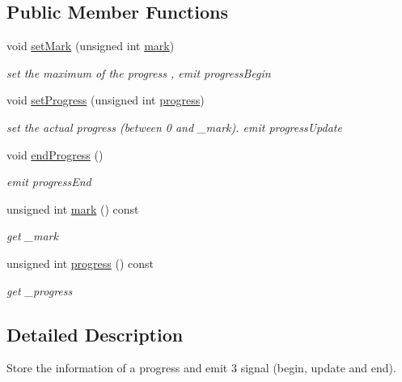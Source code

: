 \subsection*{Public Member Functions}
\begin{DoxyCompactItemize}
\item 
void \mbox{\hyperlink{class_progress_info_ac67672902957c1cd4629d33ed1d76e81}{set\+Mark}} (unsigned int \mbox{\hyperlink{class_progress_info_a9d81184d13006d316c5c46133b7ff409}{mark}})
\begin{DoxyCompactList}\small\item\em set the maximum of the progress , emit progress\+Begin \end{DoxyCompactList}\item 
void \mbox{\hyperlink{class_progress_info_acbc2662a15cb1212bdbb223544f8b3d4}{set\+Progress}} (unsigned int \mbox{\hyperlink{class_progress_info_a0cf245dd88d85029da4952e1f74acc0f}{progress}})
\begin{DoxyCompactList}\small\item\em set the actual progress (between 0 and \+\_\+mark). emit progress\+Update \end{DoxyCompactList}\item 
\mbox{\label{class_progress_info_af1f35fef86b813a7c9e60030806d9ffd}} 
void \mbox{\hyperlink{class_progress_info_af1f35fef86b813a7c9e60030806d9ffd}{end\+Progress}} ()
\begin{DoxyCompactList}\small\item\em emit progress\+End \end{DoxyCompactList}\item 
unsigned int \mbox{\hyperlink{class_progress_info_a9d81184d13006d316c5c46133b7ff409}{mark}} () const
\begin{DoxyCompactList}\small\item\em get \+\_\+mark \end{DoxyCompactList}\item 
unsigned int \mbox{\hyperlink{class_progress_info_a0cf245dd88d85029da4952e1f74acc0f}{progress}} () const
\begin{DoxyCompactList}\small\item\em get \+\_\+progress \end{DoxyCompactList}\end{DoxyCompactItemize}


\subsection{Detailed Description}
Store the information of a progress and emit 3 signal (begin, update and end). 


